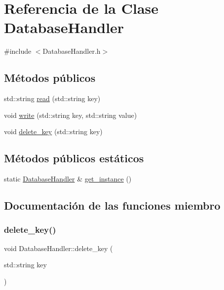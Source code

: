 \hypertarget{classDatabaseHandler}{}\section{Referencia de la Clase Database\+Handler}
\label{classDatabaseHandler}


{\ttfamily \#include $<$Database\+Handler.\+h$>$}

\subsection*{Métodos públicos}
\begin{DoxyCompactItemize}
\item 
std\+::string \hyperlink{classDatabaseHandler_aa63e4f240a1525666ea768aee69a2001}{read} (std\+::string key)
\item 
void \hyperlink{classDatabaseHandler_a45bea506977bb1f4ab02838fbde27d45}{write} (std\+::string key, std\+::string value)
\item 
void \hyperlink{classDatabaseHandler_aeb62551ab19e63f28d2f0607eaa95793}{delete\+\_\+key} (std\+::string key)
\end{DoxyCompactItemize}
\subsection*{Métodos públicos estáticos}
\begin{DoxyCompactItemize}
\item 
static \hyperlink{classDatabaseHandler}{Database\+Handler} \& \hyperlink{classDatabaseHandler_a76199057f644c31cb310b09f65919288}{get\+\_\+instance} ()
\end{DoxyCompactItemize}


\subsection{Documentación de las funciones miembro}
\mbox{\label{classDatabaseHandler_aeb62551ab19e63f28d2f0607eaa95793}} 
\subsubsection{\texorpdfstring{delete\+\_\+key()}{delete\_key()}}
{\footnotesize\ttfamily void Database\+Handler\+::delete\+\_\+key (\begin{DoxyParamCaption}\item[{std\+::string}]{key }\end{DoxyParamCaption})}

